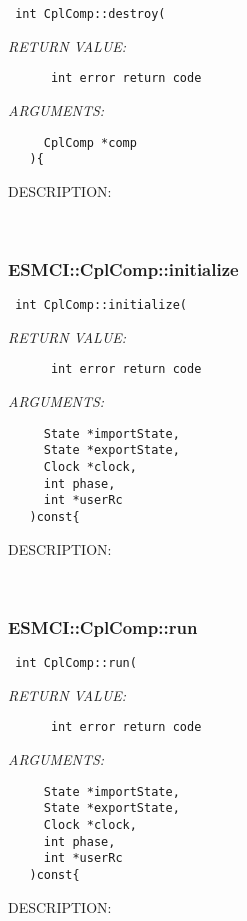   
\begin{verbatim} int CplComp::destroy(\end{verbatim}{\em RETURN VALUE:}
\begin{verbatim}      int error return code\end{verbatim}{\em ARGUMENTS:}
\begin{verbatim}     CplComp *comp
   ){\end{verbatim}
{\sf DESCRIPTION:\\ }


   
 
\mbox{}\hrulefill\
 
\subsubsection [ESMCI::CplComp::initialize] {ESMCI::CplComp::initialize}


  
\begin{verbatim} int CplComp::initialize(\end{verbatim}{\em RETURN VALUE:}
\begin{verbatim}      int error return code\end{verbatim}{\em ARGUMENTS:}
\begin{verbatim}     State *importState,
     State *exportState,
     Clock *clock,
     int phase,
     int *userRc
   )const{\end{verbatim}
{\sf DESCRIPTION:\\ }


   
 
\mbox{}\hrulefill\
 
\subsubsection [ESMCI::CplComp::run] {ESMCI::CplComp::run}


  
\begin{verbatim} int CplComp::run(\end{verbatim}{\em RETURN VALUE:}
\begin{verbatim}      int error return code\end{verbatim}{\em ARGUMENTS:}
\begin{verbatim}     State *importState,
     State *exportState,
     Clock *clock,
     int phase,
     int *userRc
   )const{\end{verbatim}
{\sf DESCRIPTION:\\ }


